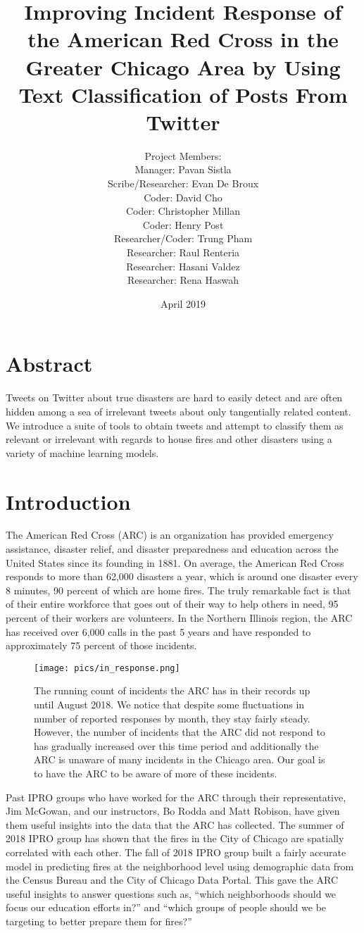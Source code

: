 \documentclass[titlepage, 12pt]{article}
\title{Improving Incident Response of the American Red Cross in the Greater Chicago Area by Using Text Classification of Posts From Twitter}
\author{Project Members: 
\\ Manager: Pavan Sistla 
\\ Scribe/Researcher: Evan De Broux 
\\ Coder: David Cho 
\\ Coder: Christopher Millan 
\\Coder: Henry Post 
\\ Researcher/Coder: Trung Pham 
\\ Researcher: Raul Renteria 
\\ Researcher: Hasani Valdez 
\\ Researcher: Rena Haswah
}
\date{April 2019}
\begin{document}
\maketitle
\newpage
\tableofcontents
\newpage

\section{Abstract}
\hspace{0.5 cm}Tweets on Twitter about true disasters are hard to easily detect and are often hidden among a sea of irrelevant tweets about only tangentially related content. We introduce a suite of tools to obtain tweets and attempt to classify them as relevant or irrelevant with regards to house fires and other disasters using a variety of machine learning models. 

\section{Introduction}
\hspace{0.5 cm}The American Red Cross (ARC) is an organization has provided emergency assistance, disaster relief, and disaster preparedness and education across the United States since its founding in 1881. On average, the American Red Cross responds to more than 62,000 disasters a year, which is around one disaster every 8 minutes, 90 percent of which are home fires. The truly remarkable fact is that of their entire workforce that goes out of their way to help others in need, 95 percent of their workers are volunteers. In the Northern Illinois region, the ARC has received over 6,000 calls in the past 5 years and have responded to approximately 75 percent of those incidents.

\begin{figure}[h!]
\centering
\texttt{[image: pics/in\_response.png]}
\caption{The running count of incidents the ARC has in their records up until August 2018. We notice that despite some fluctuations in number of reported responses by month, they stay fairly steady. However, the number of incidents that the ARC did not respond to has gradually increased over this time period and additionally the ARC is unaware of many incidents in the Chicago area. Our goal is to have the ARC to be aware of more of these incidents.}
\label{fig:incident_response}
\end{figure}

\hspace{0.5 cm}Past IPRO groups who have worked for the ARC through their representative, Jim McGowan, and our instructors, Bo Rodda and Matt Robison, have given them useful insights into the data that the ARC has collected. The summer of 2018 IPRO group has shown that the fires in the City of Chicago are spatially correlated with each other. The fall of 2018 IPRO group built a fairly accurate model in predicting fires at the neighborhood level using demographic data from the Census Bureau and the City of Chicago Data Portal. This gave the ARC useful insights to answer questions such as, ``which neighborhoods should we focus our education efforts in?'' and ``which groups of people should we be targeting to better prepare them for fires?''
\end{document}
